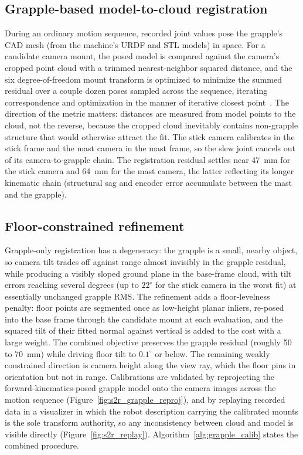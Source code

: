 \subsection{Grapple-based model-to-cloud registration}

During an ordinary motion sequence, recorded joint values pose the grapple's
CAD mesh (from the machine's URDF and STL models) in space. For a candidate
camera mount, the posed model is compared against the camera's cropped point
cloud with a trimmed nearest-neighbor squared distance, and the six
degree-of-freedom mount transform is optimized to minimize the summed
residual over a couple dozen poses sampled across the sequence, iterating
correspondence and optimization in the manner of iterative closest
point~\cite{besl1992method}. The direction of the metric matters: distances
are measured from model points to the cloud, not the reverse, because the
cropped cloud inevitably contains non-grapple structure that would otherwise
attract the fit. The stick camera calibrates in the stick frame and the mast
camera in the mast frame, so the slew joint cancels out of its
camera-to-grapple chain. The registration residual settles near 47~mm for
the stick camera and 64~mm for the mast camera, the latter reflecting its
longer kinematic chain (structural sag and encoder error accumulate between
the mast and the grapple).

\subsection{Floor-constrained refinement}

Grapple-only registration has a degeneracy: the grapple is a small, nearby
object, so camera tilt trades off against range almost invisibly in the
grapple residual, while producing a visibly sloped ground plane in the
base-frame cloud, with tilt errors reaching several degrees (up to
$22^{\circ}$ for the stick camera in the worst fit) at essentially unchanged
grapple RMS. The refinement adds a floor-levelness penalty: floor points are
segmented once as low-height planar inliers, re-posed into the base frame
through the candidate mount at each evaluation, and the squared tilt of
their fitted normal against vertical is added to the cost with a large
weight. The combined objective preserves the grapple residual (roughly 50 to
70~mm) while driving floor tilt to $0.1^{\circ}$ or below. The remaining
weakly constrained direction is camera height along the view ray, which the
floor pins in orientation but not in range. Calibrations are validated by
reprojecting the forward-kinematics-posed grapple model onto the camera
images across the motion sequence (Figure~\ref{fig:s2r_grapple_reproj}),
and by replaying recorded data in a visualizer in which the robot
description carrying the calibrated mounts is the sole transform authority,
so any inconsistency between cloud and model is visible directly
(Figure~\ref{fig:s2r_replay}). Algorithm~\ref{alg:grapple_calib} states the
combined procedure.

